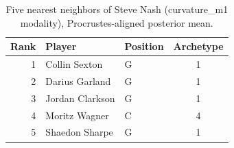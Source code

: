 \begin{table}[htbp]
  \centering\small
  \begin{tabular}{rllc}
    \toprule
    Rank & Player & Position & Archetype \\
    \midrule
    1 & Collin Sexton & G & 1 \\
    2 & Darius Garland & G & 1 \\
    3 & Jordan Clarkson & G & 1 \\
    4 & Moritz Wagner & C & 4 \\
    5 & Shaedon Sharpe & G & 1 \\
    \bottomrule
  \end{tabular}
  \caption{Five nearest neighbors of Steve Nash (curvature_m1 modality), Procrustes-aligned posterior mean.}
  \label{tab:Steve_Nash_neighbors_curvature_m1}
\end{table}


